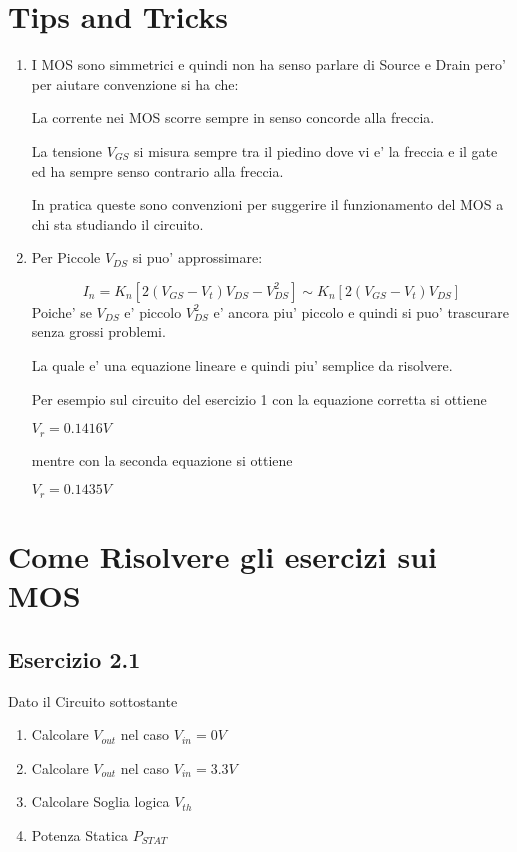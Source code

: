 \documentclass[\main/main.tex]{subfiles}
\begin{document}
\section{Tips and Tricks}
\begin{enumerate}
	\item I MOS sono simmetrici e quindi non ha senso parlare di Source e Drain pero' per aiutare convenzione si ha che:

	      La corrente nei MOS scorre sempre in senso concorde alla freccia.

	      La tensione $V_{GS}$ si misura sempre tra il piedino dove vi e' la freccia e il gate ed ha sempre senso contrario alla freccia.

	      In pratica queste sono convenzioni per suggerire il funzionamento del MOS a chi sta studiando il circuito.

	\item Per Piccole $V_{DS}$ si puo' approssimare:

	      \[I_n = K_n \left[ 2 \left( V_{GS} -V_t \right)V_{DS} - V_{DS}^2 \right] \sim K_n \left[ 2 \left( V_{GS} -V_t \right)V_{DS} \right]\]
	      Poiche' se $V_{DS}$ e' piccolo $V_{DS}^2$ e' ancora piu' piccolo e quindi si puo' trascurare senza grossi problemi.

	      La quale e' una equazione lineare e quindi piu' semplice da risolvere.

	      Per esempio sul circuito del esercizio 1 con la equazione corretta si ottiene

	      $V_r = 0.1416V$

	      mentre con la seconda equazione si ottiene

	      $V_r = 0.1435V$
\end{enumerate}

\clearpage
\section{Come Risolvere gli esercizi sui MOS}
\subsection{Esercizio 2.1}
Dato il Circuito sottostante
\begin{enumerate}
	\item  Calcolare $V_{out}$ nel caso $V_{in} = 0V$
	\item  Calcolare $V_{out}$ nel caso $V_{in} = 3.3V$
	\item  Calcolare Soglia logica $V_{th}$
	\item  Potenza Statica $P_{STAT}$
\end{enumerate}
\end{document}
